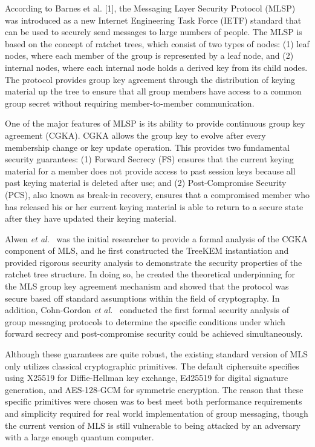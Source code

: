 \documentclass{ieeeaccess}
\begin{document}
According to Barnes et al. [1], the Messaging Layer Security Protocol (MLSP) was introduced as a new Internet Engineering Task Force (IETF) standard that can be used to securely send messages to large numbers of people. The MLSP is based on the concept of ratchet trees, which consist of two types of nodes: (1) leaf nodes, where each member of the group is represented by a leaf node, and (2) internal nodes, where each internal node holds a derived key from its child nodes. The protocol provides group key agreement through the distribution of keying material up the tree to ensure that all group members have access to a common group secret without requiring member-to-member communication.

One of the major features of MLSP is its ability to provide continuous group key agreement (CGKA). CGKA allows the group key to evolve after every membership change or key update operation. This provides two fundamental security guarantees: (1) Forward Secrecy (FS) ensures that the current keying material for a member does not provide access to past session keys because all past keying material is deleted after use; and (2) Post-Compromise Security (PCS), also known as break-in recovery, ensures that a compromised member who has released his or her current keying material is able to return to a secure state after they have updated their keying material.

Alwen \emph{et al.}~\cite{alwen2020} was the initial researcher to provide a formal analysis of the CGKA component of MLS, and he first constructed the TreeKEM instantiation and provided rigorous security analysis to demonstrate the security properties of the ratchet tree structure. In doing so, he created the theoretical underpinning for the MLS group key agreement mechanism and showed that the protocol was secure based off standard assumptions within the field of cryptography. In addition, Cohn-Gordon \emph{et al.}~\cite{cohngordon2017} conducted the first formal security analysis of group messaging protocols to determine the specific conditions under which forward secrecy and post-compromise security could be achieved simultaneously.

Although these guarantees are quite robust, the existing standard version of MLS only utilizes classical cryptographic primitives. The default ciphersuite specifies using X25519 for Diffie-Hellman key exchange, Ed25519 for digital signature generation, and AES-128-GCM for symmetric encryption. The reason that these specific primitives were chosen was to best meet both performance requirements and simplicity required for real world implementation of group messaging, though the current version of MLS is still vulnerable to being attacked by an adversary with a large enough quantum computer.
\end{document}
